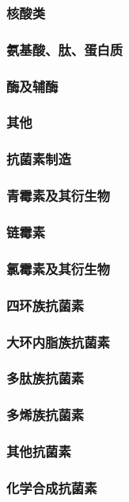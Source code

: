 \documentclass[UTF8]{../../ApplicationUniverse}
\begin{document}
    \subsubsection{核酸类}
    \subsubsection{氨基酸、肽、蛋白质}
    \subsubsection{酶及辅酶}
    \subsubsection{其他}
\subsubsection{抗菌素制造}
    \subsubsection{青霉素及其衍生物}
    \subsubsection{链霉素}
    \subsubsection{氯霉素及其衍生物}
    \subsubsection{四环族抗菌素}
    \subsubsection{大环内脂族抗菌素}
    \subsubsection{多肽族抗菌素}
    \subsubsection{多烯族抗菌素}
    \subsubsection{其他抗菌素}
        \subsubsection{化学合成抗菌素}
\end{document}
